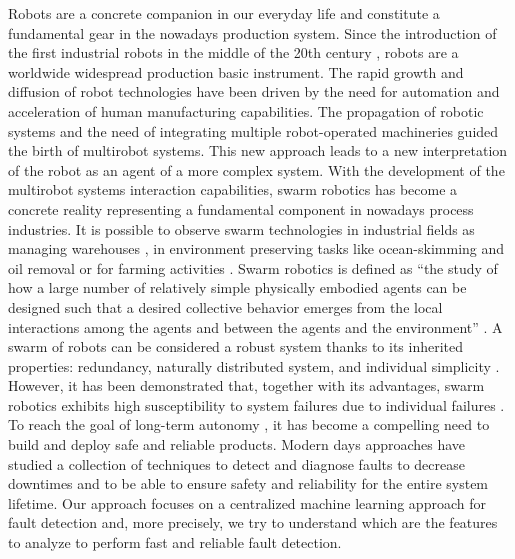 \documentclass[../../Thesis.tex]{subfiles}
\begin{document}
	Robots are a concrete companion in our everyday life and constitute a fundamental gear in the nowadays production system. Since the introduction of the first industrial robots in the middle of the 20th century \cite[pg.3-5]{Nof1999}, robots are a worldwide widespread production basic instrument. The rapid growth and diffusion of robot technologies have been driven by the need for automation and acceleration of human manufacturing capabilities. The propagation of robotic systems and the need of integrating multiple robot-operated machineries guided the birth of multirobot systems. This new approach leads to a new interpretation of the robot as an agent of a more complex system. With the development of the multirobot systems interaction capabilities, swarm robotics has become a concrete reality representing a fundamental component in nowadays process industries. It is possible to observe swarm technologies in industrial fields as managing warehouses \citep{tenhompel2020}, in environment preserving tasks like ocean-skimming and oil removal \cite{Senseable2010} or for farming activities \cite{Albani2017}. Swarm robotics is defined as “the study of how a large number of relatively simple physically embodied agents can be designed such that a desired collective behavior emerges from the local interactions among the agents and between the agents and the environment” \cite{Sahin2005}.  A swarm of robots can be considered a robust system thanks to its inherited properties: redundancy, naturally distributed system, and individual simplicity \cite{Winfield2006}. However, it has been demonstrated that, together with its advantages, swarm robotics exhibits high susceptibility to system failures due to individual failures \cite{Bjerknes2013}. 
	To reach the goal of long-term autonomy \cite{Kunze2018}, it has become a compelling need to build and deploy safe and reliable products.  Modern days approaches have studied a collection of techniques to detect and diagnose faults to decrease downtimes and to be able to ensure safety and reliability for the entire system lifetime. Our approach focuses on a centralized machine learning approach for fault detection and, more precisely, we try to understand which are the features to analyze to perform fast and reliable fault detection. \\	
\end{document}

